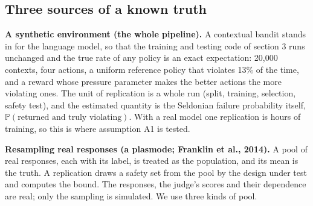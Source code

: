 \documentclass[11pt]{article}
\begin{document}
\subsection{Three sources of a known truth}

\textbf{A synthetic environment (the whole pipeline).} A contextual bandit stands in for the language model, so that the training and testing code of section 3 runs unchanged and the true rate of any policy is an exact expectation: 20,000 contexts, four actions, a uniform reference policy that violates 13\% of the time, and a reward whose pressure parameter makes the better actions the more violating ones. The unit of replication is a whole run (split, training, selection, safety test), and the estimated quantity is the Seldonian failure probability itself, $\mathbb{P} ( \text{returned and truly violating})$. With a real model one replication is hours of training, so this is where assumption A1 is tested.


\textbf{Resampling real responses (a plasmode; Franklin et al., 2014).} A pool of real responses, each with its label, is treated as the population, and its mean is the truth. A replication draws a safety set from the pool by the design under test and computes the bound. The responses, the judge's scores and their dependence are real; only the sampling is simulated. We use three kinds of pool.
\end{document}
